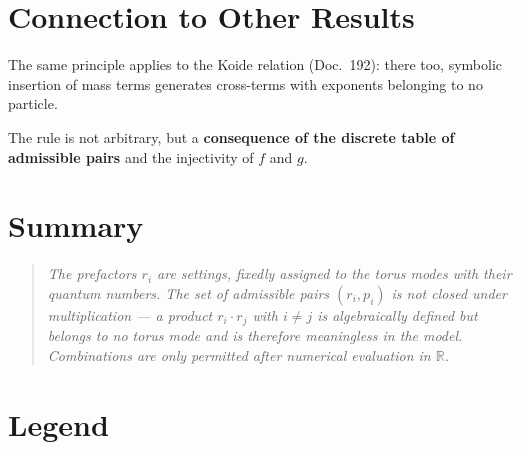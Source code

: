 \section{Connection to Other Results}

The same principle applies to the Koide relation (Doc.~192):
there too, symbolic insertion of mass terms generates cross-terms
with exponents belonging to no particle.

The rule is not arbitrary, but a \textbf{consequence of the
discrete table of admissible pairs} and the injectivity of $f$ and $g$.

\section*{Summary}

\begin{quote}
\emph{The prefactors $r_i$ are settings, fixedly assigned to the
torus modes with their quantum numbers. The set of admissible
pairs $(r_i, p_i)$ is not closed under multiplication --- a product
$r_i \cdot r_j$ with $i \neq j$ is algebraically defined but belongs
to no torus mode and is therefore meaningless in the model. Combinations
are only permitted after numerical evaluation in $\mathbb{R}$.}
\end{quote}

\section*{Legend}

